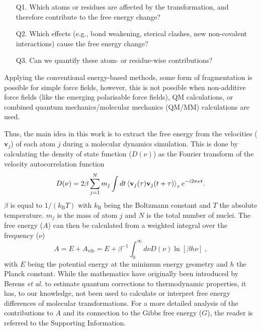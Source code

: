 \documentclass[journal=jpclcd,manuscript=article]{achemso}
\newcommand{\avib}{A_\mathrm{vib}}
\begin{document}
\begin{enumerate}
	\item[Q1.] Which atoms or residues are affected by the transformation, and therefore contribute to the free energy change?
	\item[Q2.] Which effects (e.g., bond weakening, sterical clashes, new non-covalent interactions) cause the free energy change?
	\item[Q3.] Can we quantify these atom- or residue-wise contributions?
\end{enumerate}

Applying the conventional energy-based methods\cite{Zwanzig1954,Bennett1976}, some form of fragmentation is possible for simple force fields\cite{Gao1989,Irwin2018}, however, this is not possible when non-additive force fields (like the emerging polarisable force fields\cite{Baker2015}), QM calculations, or combined quantum mechanics/molecular mechanics (QM/MM) calculations are used.

Thus, the main idea in this work is to extract the free energy from the velocities ($\mathbf{v}_j$) of each atom $j$ during a molecular dynamics simulation. This is done by calculating the density of state function ($D(\nu)$) as the Fourier transform of the velocity autocorrelation function
%
\begin{equation}
D(\nu) = 2 \beta \sum \limits_{j = 1}^{N} m_j \int dt
\braket{\mathbf{v}_j (\tau) \mathbf{v}_j (t + \tau)}_{\tau} e^{-i 2\pi \nu t}.
\label{eq1}
\end{equation}
%
$\beta$ is equal to $1/(k_\mathrm{B} T)$ with $k_\mathrm{B}$ being the Boltzmann constant and $T$ the absolute temperature. $m_j$ is the mass of atom $j$ and $N$ is the total number of nuclei. The free energy ($A$) can then be calculated from a weighted integral over the frequency ($\nu$)
%
\begin{equation}
A = E + \avib{} = E + \beta^{-1} \int_{0}^{\infty} d\nu D(\nu) \ln [\beta h \nu]\ ,
\label{eq2}
\end{equation}
%
with $E$ being the potential energy at the minimum energy geometry and $h$ the Planck constant. While the mathematics have originally been introduced by Berens \textit{et al.}\cite{Berens1983} to estimate quantum corrections to thermodynamic properties, it has, to our knowledge, not been used to calculate or interpret free energy differences of molecular transformations. For a more detailed analysis of the contributions to $A$ and its connection to the Gibbs free energy ($G$), the reader is referred to the Supporting Information.  
\end{document}
